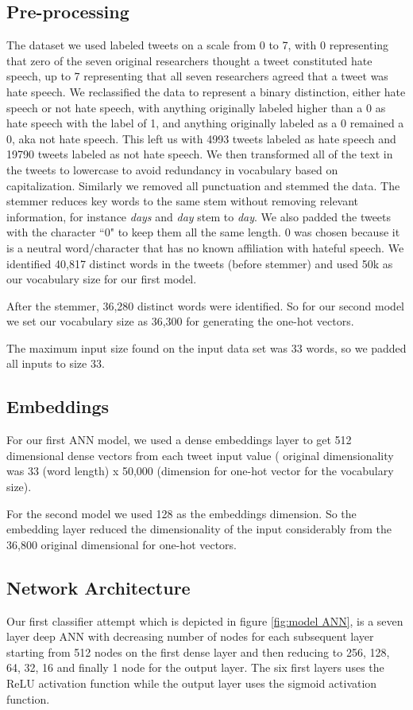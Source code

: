 \documentclass[conference]{sig-alternate-05-2015}
\begin{document}
\subsection{Pre-processing}
The dataset we used labeled tweets on a scale from 0 to 7, with 0 representing that zero of the seven original researchers thought a tweet constituted hate speech, up to 7 representing that all seven researchers agreed that a tweet was hate speech. We reclassified the data to represent a binary distinction, either hate speech or not hate speech, with anything originally labeled higher than a 0 as hate speech with the label of 1, and anything originally labeled as a 0 remained a 0, aka not hate speech. This left us with 4993 tweets labeled as hate speech and 19790 tweets labeled as not hate speech.
We then transformed all of the text in the tweets to lowercase to avoid redundancy in vocabulary based on capitalization. 
Similarly we removed all punctuation and stemmed the data. The stemmer reduces key words to the same stem without removing relevant information, for instance \textit{days} and \textit{day} stem to \textit{day}.
We also padded the tweets with the character ``0" to keep them all the same length. 0 was chosen because it is a neutral word/character that has no known affiliation with hateful speech.
We identified 40,817 distinct words in the tweets (before stemmer) and used 50k as our vocabulary size for our first model.

After the stemmer,  36,280 distinct words were identified. So for our second model we set our vocabulary size as 36,300 for generating the one-hot vectors.

The maximum input size found on the input data set was 33 words, so we padded all inputs to size 33.

\subsection{Embeddings}
For our first ANN model, we used a dense embeddings layer to get 512 dimensional dense vectors from each tweet input value ( original dimensionality was 33 (word length) x 50,000 (dimension for one-hot vector for the vocabulary size).

For the second model we used 128 as the embeddings dimension. So the  embedding layer reduced the dimensionality of the input considerably from the 36,800 original dimensional for one-hot vectors.

\subsection{Network Architecture}
Our first classifier attempt which is depicted in figure \ref{fig:model ANN}, is a seven layer deep ANN with decreasing number of nodes for each subsequent layer starting from 512 nodes on the first dense layer and then reducing to 256, 128, 64, 32, 16 and finally 1 node for the output layer. The six first layers uses the ReLU activation function while the output layer uses the sigmoid activation function.
\end{document}
